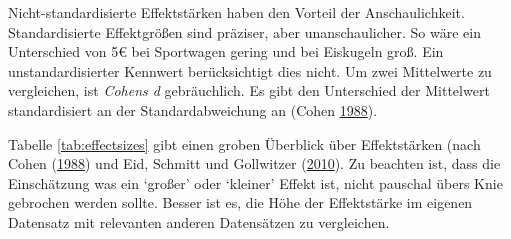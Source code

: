 \documentclass[12pt,ngerman,]{book}
\newcommand{\euro}{€}
\theoremstyle{definition}
\theoremstyle{definition}
\theoremstyle{remark}
\begin{document}
Nicht-standardisierte Effektstärken haben den Vorteil der
Anschaulichkeit. Standardisierte Effektgrößen sind präziser, aber
unanschaulicher. So wäre ein Unterschied von 5\euro{} bei Sportwagen
gering und bei Eiskugeln groß. Ein unstandardisierter Kennwert
berücksichtigt dies nicht. Um zwei Mittelwerte zu vergleichen, ist
\emph{Cohens d} gebräuchlich. Es gibt den Unterschied
der Mittelwert standardisiert an der Standardabweichung an (Cohen
\protect\hyperlink{ref-cohen_statistical_1988}{1988}).

Tabelle \ref{tab:effectsizes} gibt einen groben Überblick über
Effektstärken (nach Cohen
(\protect\hyperlink{ref-cohen_statistical_1988}{1988}) und Eid, Schmitt
und Gollwitzer (\protect\hyperlink{ref-eid2010statistik}{2010}). Zu
beachten ist, dass die Einschätzung was ein `großer' oder `kleiner'
Effekt ist, nicht pauschal übers Knie gebrochen werden sollte. Besser
ist es, die Höhe der Effektstärke im eigenen Datensatz mit relevanten
anderen Datensätzen zu vergleichen.
\end{document}
